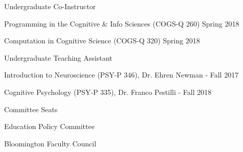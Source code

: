 \begin{cvpubentries}


  \cvpubentry
    {Undergraduate Co-Instructor} %
    { } %
    { } %
    { } %
    {
      \begin{cvitems} %
        \item{Programming in the Cognitive \& Info Sciences (COGS-Q 260) Spring 2018}
	\item{Computation in Cognitive Science (COGS-Q 320) Spring 2018}
      \end{cvitems}
    }
  \cvpubentry
    {Undergraduate Teaching Assistant} %
    {} %
    {} %
    {} %
    {
      \begin{cvitems} %
        \item {Introduction to Neuroscience (PSY-P 346), Dr. Ehren Newman - Fall 2017}
	\item {Cognitive Psychology (PSY-P 335), Dr. Franco Pestilli - Fall 2018}
      \end{cvitems}
    }

\cvpubentry
    {Committee Seats} %
    {} %
    {} %
    {} %
    {
      \begin{cvitems} %
        \item {Education Policy Committee}
	\item{Bloomington Faculty Council}
      \end{cvitems}
    }

\end{cvpubentries}
